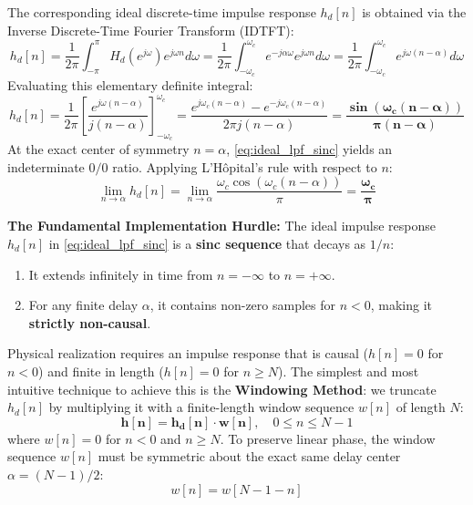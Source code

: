 \documentclass[11pt,a4paper]{article}
\begin{document}
The corresponding ideal discrete-time impulse response $h_d[n]$ is obtained via the Inverse Discrete-Time Fourier Transform (IDTFT):
\begin{equation}
h_d[n] = \frac{1}{2\pi} \int_{-\pi}^\pi H_d(e^{j\omega}) e^{j\omega n} d\omega = \frac{1}{2\pi} \int_{-\omega_c}^{\omega_c} e^{-j\alpha \omega} e^{j\omega n} d\omega = \frac{1}{2\pi} \int_{-\omega_c}^{\omega_c} e^{j\omega(n - \alpha)} d\omega
\end{equation}
Evaluating this elementary definite integral:
\begin{equation}
h_d[n] = \frac{1}{2\pi} \left[ \frac{e^{j\omega(n - \alpha)}}{j(n - \alpha)} \right]_{-\omega_c}^{\omega_c} = \frac{e^{j\omega_c(n - \alpha)} - e^{-j\omega_c(n - \alpha)}}{2\pi j (n - \alpha)} = \mathbf{\frac{\sin(\omega_c(n - \alpha))}{\pi (n - \alpha)}}
\label{eq:ideal_lpf_sinc}
\end{equation}
At the exact center of symmetry $n = \alpha$, \eqref{eq:ideal_lpf_sinc} yields an indeterminate $0/0$ ratio. Applying L'H\^opital's rule with respect to $n$:
\begin{equation}
\lim_{n \to \alpha} h_d[n] = \lim_{n \to \alpha} \frac{\omega_c \cos(\omega_c(n - \alpha))}{\pi} = \mathbf{\frac{\omega_c}{\pi}}
\label{eq:lhopital_center}
\end{equation}

\noindent\textbf{The Fundamental Implementation Hurdle:}
The ideal impulse response $h_d[n]$ in \eqref{eq:ideal_lpf_sinc} is a \textbf{sinc sequence} that decays as $1/n$:
\begin{enumerate}
    \item It extends infinitely in time from $n = -\infty$ to $n = +\infty$.
    \item For any finite delay $\alpha$, it contains non-zero samples for $n < 0$, making it \textbf{strictly non-causal}.
\end{enumerate}
Physical realization requires an impulse response that is causal ($h[n] = 0$ for $n < 0$) and finite in length ($h[n] = 0$ for $n \ge N$). The simplest and most intuitive technique to achieve this is the \textbf{Windowing Method}: we truncate $h_d[n]$ by multiplying it with a finite-length window sequence $w[n]$ of length $N$:
\begin{equation}
\mathbf{h[n] = h_d[n] \cdot w[n]}, \quad 0 \le n \le N-1
\label{eq:window_mult}
\end{equation}
where $w[n] = 0$ for $n < 0$ and $n \ge N$. To preserve linear phase, the window sequence $w[n]$ must be symmetric about the exact same delay center $\alpha = (N-1)/2$:
\begin{equation}
w[n] = w[N - 1 - n]
\end{equation}
\end{document}
